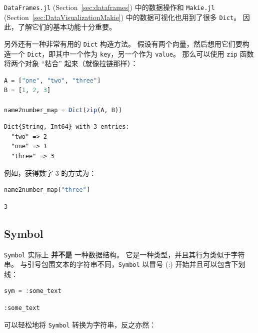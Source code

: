 \documentclass[
  notoc %
]{tufte-book}
\newcommand{\passthrough}[1]{#1}
\begin{document}
\passthrough{\lstinline!DataFrames.jl!} (Section~\ref{sec:dataframes})
中的数据操作和 \passthrough{\lstinline!Makie.jl!}
(Section~\ref{sec:DataVisualizationMakie}) 中的数据可视化也用到了很多
\passthrough{\lstinline!Dict!}。 因此，了解它们的基本功能十分重要。

另外还有一种非常有用的 \passthrough{\lstinline!Dict!} 构造方法。
假设有两个向量，然后想用它们要构造一个
\passthrough{\lstinline!Dict!}，即其中一个作为
\passthrough{\lstinline!key!}，另一个作为
\passthrough{\lstinline!value!}。 那么可以使用
\passthrough{\lstinline!zip!} 函数将两个对象 ``粘合''
起来（就像拉链那样）：

\begin{lstlisting}[language=Julia]
A = ["one", "two", "three"]
B = [1, 2, 3]

name2number_map = Dict(zip(A, B))
\end{lstlisting}

\begin{lstlisting}[language=Output]
Dict{String, Int64} with 3 entries:
  "two" => 2
  "one" => 1
  "three" => 3
\end{lstlisting}

例如，获得数字 3 的方式为：

\begin{lstlisting}[language=Julia]
name2number_map["three"]
\end{lstlisting}

\begin{lstlisting}[language=Output]
3
\end{lstlisting}

\hypertarget{sec:symbol}{%
\subsection{Symbol}\label{sec:symbol}}

\passthrough{\lstinline!Symbol!} 实际上 \textbf{并不是} 一种数据结构。
它是一种类型，并且其行为类似于字符串。
与引号包围文本的字符串不同，\passthrough{\lstinline!Symbol!} 以冒号 (:)
开始并且可以包含下划线：

\begin{lstlisting}[language=Julia]
sym = :some_text
\end{lstlisting}

\begin{lstlisting}[language=Output]
:some_text
\end{lstlisting}

可以轻松地将 \passthrough{\lstinline!Symbol!} 转换为字符串，反之亦然：
\end{document}
